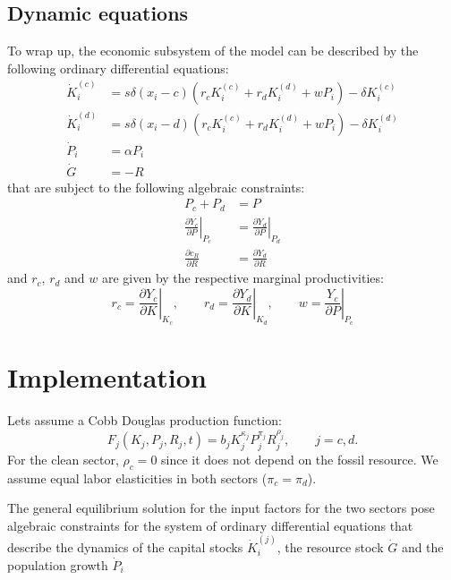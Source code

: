 \subsection{Dynamic equations}
To wrap up, the economic subsystem of the model can be described by the following ordinary differential equations:
\begin{align}
	\dot{K}_i^{(c)} &= s \delta(x_i - c) (r_c K_i^{(c)} + r_d K_i^{(d)} + w P_i) - \delta K_i^{(c)} \nonumber \\
	\dot{K}_i^{(d)} &= s \delta(x_i - d) (r_c K_i^{(c)} + r_d K_i^{(d)} + w P_i) - \delta K_i^{(d)} \nonumber \\
	\dot{P}_i &= \alpha P_i \nonumber \\
	\dot{G} &= - R 
\end{align}
that are subject to the following algebraic constraints:
\begin{align}
	P_c + P_d &= P \\
	\left. \frac{\partial Y_c}{\partial P} \right|_{P_c} &= \left. \frac{\partial Y_d}{\partial P} \right|_{P_d} \\
	\frac{\partial c_R}{\partial R} &= \frac{\partial Y_d}{\partial R} 
\end{align}
and $r_c$, $r_d$ and $w$ are given by the respective marginal productivities:
\begin{equation}
	r_c = \left. \frac{\partial Y_c}{\partial K} \right|_{K_c}, \qquad r_d = \left. \frac{\partial Y_d}{\partial K} \right|_{K_d}, \qquad w = \left. \frac{Y_c}{\partial P} \right|_{P_c} 
\end{equation} 


\section{Implementation}

Lets assume a Cobb Douglas production function:
\begin{equation}
	F_j(K_j,P_j,R_j,t) = b_j K_j^{\kappa_j}P_j^{\pi_j}R_j^{\rho_j}, \qquad j = c,d.
	\label{cobb_douglas}
\end{equation}
For the clean sector, $\rho_c = 0$ since it does not depend on the fossil resource. We assume equal labor elasticities in both sectors ($\pi_c = \pi_d$).

The general equilibrium solution for the input factors for the two sectors pose algebraic constraints for the system of ordinary differential equations that describe the dynamics of the capital stocks $\dot{K}_i^{(j)}$, the resource stock $\dot{G}$ and the population growth $\dot{P}_i$

